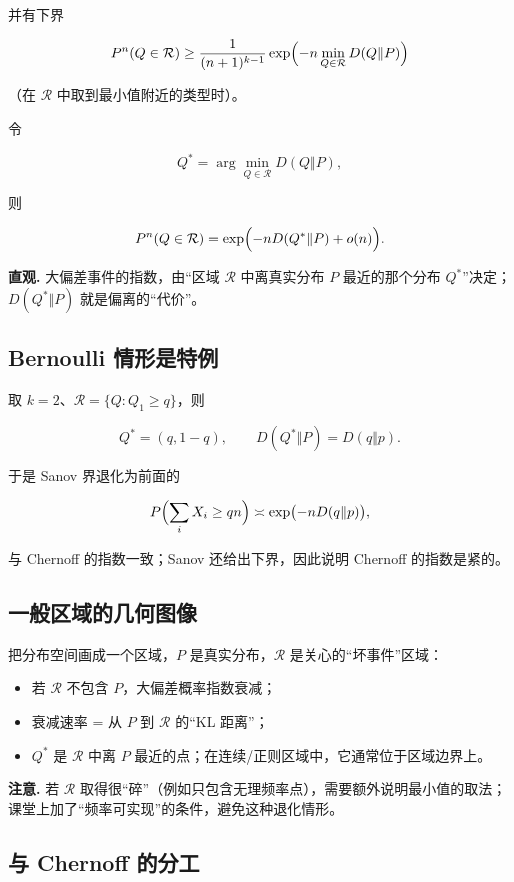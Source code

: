 并有下界

\[
P^n(Q\in\mathcal R)
\ge \frac{1}{(n+1)^{k-1}}
\exp\Bigl(-n\min_{Q\in\mathcal R}D(Q\Vert P)\Bigr)
\]

（在 $\mathcal R$ 中取到最小值附近的类型时）。

令

\[
Q^*=\arg\min_{Q\in\mathcal R}D(Q\Vert P),
\]

则

\[
P^n(Q\in\mathcal R)
=\exp\Bigl(-nD(Q^*\Vert P)+o(n)\Bigr).
\]

\textbf{直观.} 大偏差事件的指数，由“区域 $\mathcal R$ 中离真实分布 $P$ 最近的那个分布 $Q^*$”决定；$D(Q^*\Vert P)$ 就是偏离的“代价”。

\subsection{Bernoulli 情形是特例}


取 $k=2$、$\mathcal R=\{Q:Q_1\ge q\}$，则

\[
Q^*=(q,1-q),\qquad
D(Q^*\Vert P)=D(q\Vert p).
\]

于是 Sanov 界退化为前面的

\[
P\Bigl(\sum_iX_i\ge qn\Bigr)
\asymp\exp\bigl(-nD(q\Vert p)\bigr),
\]

与 Chernoff 的指数一致；Sanov 还给出下界，因此说明 Chernoff 的指数是紧的。

\subsection{一般区域的几何图像}


把分布空间画成一个区域，$P$ 是真实分布，$\mathcal R$ 是关心的“坏事件”区域：

\begin{itemize}
\item 若 $\mathcal R$ 不包含 $P$，大偏差概率指数衰减；
\item 衰减速率 = 从 $P$ 到 $\mathcal R$ 的“KL 距离”；
\item $Q^*$ 是 $\mathcal R$ 中离 $P$ 最近的点；在连续/正则区域中，它通常位于区域边界上。
\end{itemize}


\textbf{注意.} 若 $\mathcal R$ 取得很“碎”（例如只包含无理频率点），需要额外说明最小值的取法；课堂上加了“频率可实现”的条件，避免这种退化情形。

\subsection{与 Chernoff 的分工}



